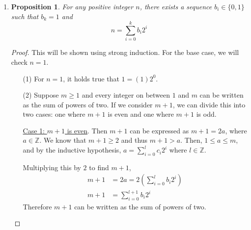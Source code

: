 \documentclass{homework}
\newtheorem*{prop}{Proposition}
\begin{document}
\begin{enumerate}
\begin{minipage}[t]{\linewidth}
\begin{proof}
\begin{enumerate}
					\item[(2)] If we suppose the proposition is true for $k$, we will show it is also true for $k+1$. On the LHS, the $k+1$ term is
					\begin{align*}
						2^{k+2} & = 2\left( 2^{k+1} \right)
						\intertext{From the proposition,}
						2(2^{k+1}) & > 2\sum_{i = 0}^k 2^i && \text{(assuming the hypothesis)} \\
						2(2^{k+1}) & > \sum_{i = 0}^k 2^{i+1} && \text{(moving the 2 into the indexed term)} \\						
						2(2^{k+1}) & > \sum_{i = 0}^{k + 1} 2^{i} && \text{(changing the indices)}
						\intertext{Substituting the original expression, it follows by induction that}
						2^{k+2} & > \sum_{i = 0}^{k + 1} 2^{i}
					\end{align*}
				\end{enumerate}
			\end{proof}
		\end{minipage}
	
		\item  \begin{minipage}[t]{\linewidth}
			\begin{prop}
				For any positive integer $n$, there exists a sequence $b_i \in \{0, 1\}$ such that $b_k = 1$ and $$n = \sum_{i=0}^k b_i 2^i $$
			\end{prop}
			\begin{proof} This will be shown using strong induction. For the base case, we will check $n=1$. \begin{enumerate}
					\item[(1)] For $n=1$, it holds true that $1 = (1) 2^0$.
					\item[(2)] Suppose $m \ge 1$ and every integer on between $1$ and $m$ can be written as the sum of powers of two. If we consider $m+1$, we can divide this into two cases: one where $m+1$ is even and one where $m+1$ is odd.
					
					\underline{Case 1:  $m+1$ is even}. Then $m+1$ can be expressed as $m + 1 = 2a$, where $a \in \mathbb{Z}$. We know that $m+1 \ge 2$ and thus $m+1 > a$. Then, $1 \le a \le m$, and by the inductive hypothesis, $a = \sum_{i=0}^l c_i 2^i$ where $l \in \mathbb{Z}$.
					
					Multiplying this by $2$ to find $m+1$, \begin{align*}
						m+1 & = 2a = 2\left(\sum_{i=0}^l b_i 2^i\right) \\
						m+1 & = \sum_{i=0}^{l+1} b_i 2^{i}
					\end{align*}
					Therefore $m+1$ can be written as the sum of powers of two.
					

\end{enumerate}
\end{proof}
\end{minipage}
\end{enumerate}
\end{document}
